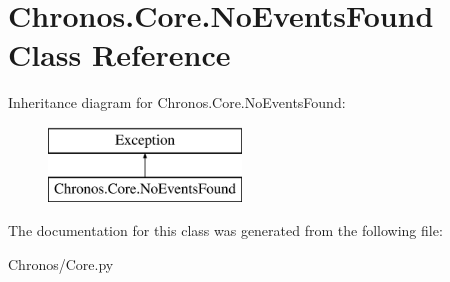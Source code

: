 \hypertarget{classChronos_1_1Core_1_1NoEventsFound}{}\section{Chronos.\+Core.\+No\+Events\+Found Class Reference}
\label{classChronos_1_1Core_1_1NoEventsFound}
Inheritance diagram for Chronos.\+Core.\+No\+Events\+Found\+:\begin{figure}[H]
\begin{center}
\leavevmode
\includegraphics[height=2.000000cm]{classChronos_1_1Core_1_1NoEventsFound}
\end{center}
\end{figure}


The documentation for this class was generated from the following file\+:\begin{DoxyCompactItemize}
\item 
Chronos/Core.\+py\end{DoxyCompactItemize}

